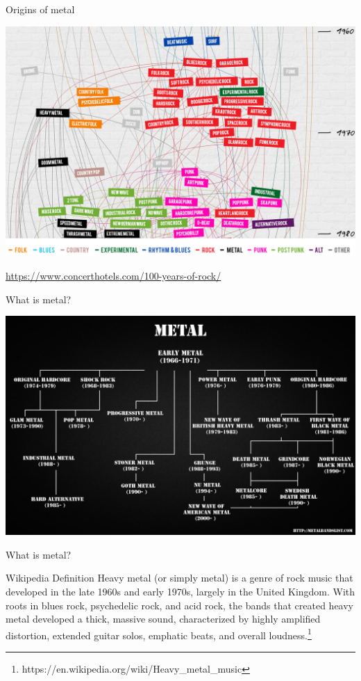 \documentclass{beamer}
\begin{document}
    \begin{frame}{Origins of metal}
      \begin{center}
        \includegraphics[scale=.33]{familyTree2}
      \end{center}
      \href{https://www.concerthotels.com/100-years-of-rock/}{https://www.concerthotels.com/100-years-of-rock/}
    \end{frame}

    \begin{frame}{What is metal?}
      \pause
      \begin{center}
        \includegraphics[scale=.18]{familyTree}
      \end{center}
    \end{frame}

    \begin{frame}{What is metal?}

      \begin{block}{Wikipedia Definition}
        Heavy metal (or simply metal) is a genre of rock music that developed in the late 1960s
        and early 1970s, largely in the United Kingdom. With roots in blues rock, psychedelic rock,
        and acid rock, the bands that created heavy metal developed a thick, massive sound,
        characterized by highly amplified distortion, extended guitar solos, emphatic beats,
        and overall loudness.\footnote{https://en.wikipedia.org/wiki/Heavy\_metal\_music}
      \end{block}

    \end{frame}
\end{document}
